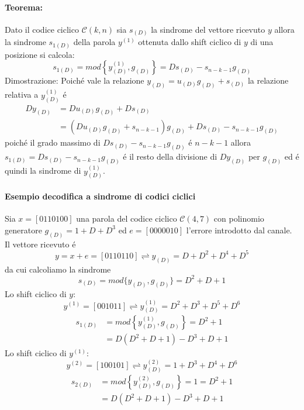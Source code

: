             \paragraph{Teorema:} Dato il codice ciclico $\mathcal{C}(k,n)$ sia $s_{(D)}$ la sindrome del vettore ricevuto
                $y$ allora la sindrome $s_{1(D)}$ della parola $y^{(1)}$ ottenuta dallo shift ciclico di $y$ di una posizione 
                si calcola:
                \[
                    s_{1(D)} = mod\left\{y^{(1)}_{(D)},g_{(D)}\right\} = Ds_{(D)}-s_{n-k-1}g_{(D)}    
                \]
                Dimostrazione: Poiché vale la relazione $y_{(D)} = u_{(D)}g_{(D)} + s_{(D)}$ la relazione relativa a $y^{(1)}_{(D)}$ é \
                \begin{align}
                    Dy_{(D)} &= Du_{(D)}g_{(D)} + Ds_{(D)}\nonumber \\
                            &= (Du_{(D)}g_{(D)} +s_{n-k-1})g_{(D)} + Ds_{(D)}-s_{n-k-1}g_{(D)}\nonumber
                \end{align}
                poiché il grado massimo di $Ds_{(D)}-s_{n-k-1}g_{(D)}$ é $n-k-1$ allora $s_{1(D)} = Ds_{(D)}-s_{n-k-1}g_{(D)}$ é il 
                resto della divisione di $Dy_{(D)}$ per $g_{(D)}$ ed é quindi la sindrome di $y^{(1)}_{(D)}$.
            \paragraph{Esempio decodifica a sindrome di codici ciclici}
                Sia $x=[0110100]$ una parola del codice ciclico $\mathcal{C}(4,7)$ con polinomio generatore $g_{(D)} = 1 + D + D^3$
                ed $e=[0000010]$ l'errore introdotto dal canale. Il vettore ricevuto é 
                \[
                    y= x+e = [0110110]\rightleftharpoons y_{(D)} = D+D^2+D^4+D^5 
                \]
                da cui calcoliamo la sindrome 
                \[
                    s_{(D)} = mod\{y_{(D)},g_{(D)}\}=D^2+D+1
                \]
                Lo shift ciclico di $y$:
                \[
                    y^{(1)} = [001011] \rightleftharpoons y^{(1)}_{(D)} = D^2+D^3+D^5+D^6   
                \]
                \begin{align}
                    s_{1(D)} &= mod\left\{y^{(1)}_{(D)},g_{(D)}\right\}= D^2+1  \nonumber \\
                             &= D(D^2+D+1)-D^3+D+1 \nonumber
                \end{align}
                Lo shift ciclico di $y^{(1)}$:
                \[
                    y^{(2)} = [100101] \rightleftharpoons y^{(2)}_{(D)} = 1+D^3+D^4+D^6   
                \]
                \begin{align}
                    s_{2(D)} &= mod\left\{y^{(2)}_{(D)},g_{(D)}\right\}= 1 = D^2+1  \nonumber \\
                             &= D(D^2+D+1)-D^3+D+1 \nonumber
                \end{align}
